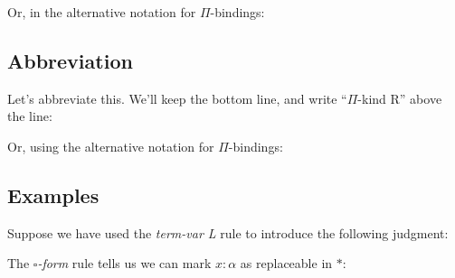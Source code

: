 \documentclass{book}
\numberwithin{equation}{chapter}
\begin{document}
\noindent
Or, in the alternative notation for $\Pi$-bindings:

\begin{prooftree}


\end{prooftree}


\subsection{Abbreviation}

Let's abbreviate this. We'll keep the bottom line, and write ``$\Pi$-kind R'' above the line:

\begin{prooftree}
\end{prooftree}

\noindent
Or, using the alternative notation for $\Pi$-bindings:

\begin{prooftree}
\end{prooftree}


\subsection{Examples}

Suppose we have used the \textit{term-var L} rule to introduce the following judgment:

\begin{prooftree}
\end{prooftree}

\noindent
The \textit{$\square$-form} rule tells us we can mark $x : \alpha$ as replaceable in $\ast$:

\begin{prooftree}
\end{prooftree}
\end{document}
